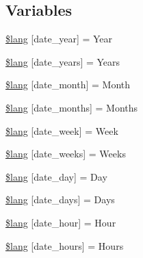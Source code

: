 \subsection*{Variables}
\begin{DoxyCompactItemize}
\item 
\mbox{\hyperlink{date__lang_8php_a0e08dd6cd5135d97d48d1e6c543622aa}{\$lang}} \mbox{[}\textquotesingle{}date\+\_\+year\textquotesingle{}\mbox{]} = \textquotesingle{}Year\textquotesingle{}
\item 
\mbox{\hyperlink{date__lang_8php_abcf9f3f2b8ac9be4ea1ad49210b1e677}{\$lang}} \mbox{[}\textquotesingle{}date\+\_\+years\textquotesingle{}\mbox{]} = \textquotesingle{}Years\textquotesingle{}
\item 
\mbox{\hyperlink{date__lang_8php_a585754183b0d89cc0184f7a1ba8e4557}{\$lang}} \mbox{[}\textquotesingle{}date\+\_\+month\textquotesingle{}\mbox{]} = \textquotesingle{}Month\textquotesingle{}
\item 
\mbox{\hyperlink{date__lang_8php_a25da59a54a07cc2cbe01227a80d05b9f}{\$lang}} \mbox{[}\textquotesingle{}date\+\_\+months\textquotesingle{}\mbox{]} = \textquotesingle{}Months\textquotesingle{}
\item 
\mbox{\hyperlink{date__lang_8php_ae8b3e7ba598202350cba45a12c7f1f3e}{\$lang}} \mbox{[}\textquotesingle{}date\+\_\+week\textquotesingle{}\mbox{]} = \textquotesingle{}Week\textquotesingle{}
\item 
\mbox{\hyperlink{date__lang_8php_a828ef4bc38886194cf3c21daf3a9497b}{\$lang}} \mbox{[}\textquotesingle{}date\+\_\+weeks\textquotesingle{}\mbox{]} = \textquotesingle{}Weeks\textquotesingle{}
\item 
\mbox{\hyperlink{date__lang_8php_a6e0d9671ff00251068a461bf3ac2ecc4}{\$lang}} \mbox{[}\textquotesingle{}date\+\_\+day\textquotesingle{}\mbox{]} = \textquotesingle{}Day\textquotesingle{}
\item 
\mbox{\hyperlink{date__lang_8php_a9f64bb4ba6d656ce3e7bc863179d3851}{\$lang}} \mbox{[}\textquotesingle{}date\+\_\+days\textquotesingle{}\mbox{]} = \textquotesingle{}Days\textquotesingle{}
\item 
\mbox{\hyperlink{date__lang_8php_aa828796965e9d1d80e021a3dc7b112e7}{\$lang}} \mbox{[}\textquotesingle{}date\+\_\+hour\textquotesingle{}\mbox{]} = \textquotesingle{}Hour\textquotesingle{}
\item 
\mbox{\hyperlink{date__lang_8php_a5cc3bf273df08ef5ee41a226542644de}{\$lang}} \mbox{[}\textquotesingle{}date\+\_\+hours\textquotesingle{}\mbox{]} = \textquotesingle{}Hours\textquotesingle{}

\end{DoxyCompactItemize}
